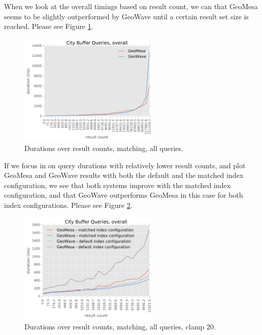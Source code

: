 When we look at the overall timings based on result count, we can that GeoMesa seems to be slightly
outperformed by GeoWave until a certain result set size is reached.
Please see Figure \ref{matching}.

\begin{figure}[h!tb]
  \centering
  \includegraphics[width=0.60\textwidth]{../docs/img/gdelt/overall-duration-vs-result-matching.png}
  \caption{Durations over result counts, matching, all queries.}
  \label{matching}
\end{figure}

If we focus in on query durations with relatively lower result counts,
and plot GeoMesa and GeoWave results with both the default and the matched index configuration,
we see that both systems improve with the matched index configuration,
and that GeoWave outperforms GeoMesa in this case for both index configurations.
Please see Figure \ref{matchingclamp20}.


\begin{figure}[h!tb]
  \centering
  \includegraphics[width=0.60\textwidth]{../docs/img/gdelt/overall-duration-vs-result-both-cap-20.png}
  \caption{Durations over result counts, matching, all queries, clamp $20$.}
  \label{matchingclamp20}
\end{figure}

